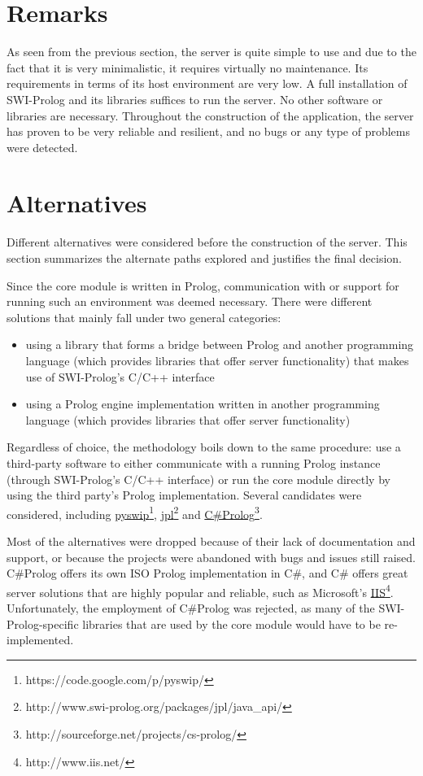 \documentclass[11pt,twoside,a4paper]{report}
\begin{document}
\section{Remarks}
As seen from the previous section, the server is quite simple to use and due to the fact that it is very minimalistic, it requires virtually no maintenance. Its requirements in terms of its host environment are very low. A full installation of SWI-Prolog and its libraries suffices to run the server. No other software or libraries are necessary. Throughout the construction of the application, the server has proven to be very reliable and resilient, and no bugs or any type of problems were detected.

\section{Alternatives}
Different alternatives were considered before the construction of the server. This section summarizes the alternate paths explored and justifies the final decision.

Since the core module is written in Prolog, communication with or support for running such an environment was deemed necessary. There were different solutions that mainly fall under two general categories:
\begin{itemize}
\item
using a library that forms a bridge between Prolog and another programming language (which provides libraries that offer server functionality) that makes use of SWI-Prolog's C/C++ interface
\item
using a Prolog engine implementation written in another programming language (which provides libraries that offer server functionality)
\end{itemize}

Regardless of choice, the methodology boils down to the same procedure: use a third-party software to either communicate with a running Prolog instance (through SWI-Prolog's C/C++ interface) or run the core module directly by using the third party's Prolog implementation. Several candidates were considered, including \href{https://code.google.com/p/pyswip/}{pyswip}\footnote{https://code.google.com/p/pyswip/}, \href{http://www.swi-prolog.org/packages/jpl/java\_api/}{jpl}\footnote{http://www.swi-prolog.org/packages/jpl/java\_api/} and \href{http://sourceforge.net/projects/cs-prolog/}{C\#Prolog}\footnote{http://sourceforge.net/projects/cs-prolog/}.

Most of the alternatives were dropped because of their lack of documentation and support, or because the projects were abandoned with bugs and issues still raised. C\#Prolog offers its own ISO Prolog implementation in C\#, and C\# offers great server solutions that are highly popular and reliable, such as Microsoft's \href{http://www.iis.net/}{IIS}\footnote{http://www.iis.net/}. Unfortunately, the employment of C\#Prolog was rejected, as many of the SWI-Prolog-specific libraries that are used by the core module would have to be re-implemented.
\end{document}
